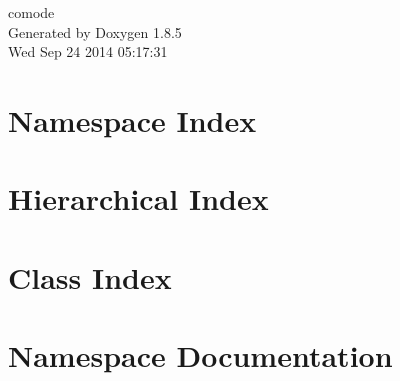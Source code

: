 \documentclass[twoside]{book}
\newcommand{\clearemptydoublepage}{%
  \newpage{\pagestyle{empty}\cleardoublepage}%
}
\begin{document}
\hypersetup{pageanchor=false}
\begin{titlepage}
\vspace*{7cm}
\begin{center}%
{\Large comode }\\
\vspace*{1cm}
{\large Generated by Doxygen 1.8.5}\\
\vspace*{0.5cm}
{\small Wed Sep 24 2014 05:17:31}\\
\end{center}
\end{titlepage}
\clearemptydoublepage
\tableofcontents
\clearemptydoublepage
{}
\hypersetup{pageanchor=true}

\chapter{Namespace Index}

\chapter{Hierarchical Index}

\chapter{Class Index}

\chapter{Namespace Documentation}

\end{document}
